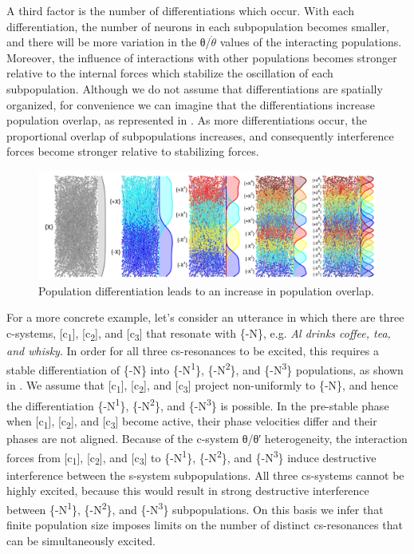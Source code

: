   A third factor is the number of differentiations which occur. With each differentiation, the number of neurons in each subpopulation becomes smaller, and there will be more variation in the θ/$\dot{\theta}$ values of the interacting populations. Moreover, the influence of interactions with other populations becomes stronger relative to the internal forces which stabilize the oscillation of each subpopulation.  Although we do not assume that differentiations are spatially organized, for convenience we can imagine that the differentiations increase population overlap, as represented in {}. As more differentiations occur, the proportional overlap of subpopulations increases, and consequently interference forces become stronger relative to stabilizing forces.

  
\begin{figure}
\includegraphics[width=\textwidth]{figures/Tilsen-img91.png}
\caption{Population differentiation leads to an increase in population overlap.}
\label{fig:4:41}
\end{figure}
 

  For a more concrete example, let's consider an utterance in which there are three c-systems, [c\textsubscript{1}], [c\textsubscript{2}], and [c\textsubscript{3}] that resonate with \{-N\}, e.g. \textit{Al drinks coffee, tea, and whisky}. In order for all three cs-resonances to be excited, this requires a stable differentiation of \{-N\} into \{-N\textsuperscript{1}\}, \{-N\textsuperscript{2}\}, and \{-N\textsuperscript{3}\} populations, as shown in {}. We assume that [c\textsubscript{1}], [c\textsubscript{2}], and [c\textsubscript{3}] project non-uniformly to \{-N\}, and hence the differentiation \{-N\textsuperscript{1}\}, \{-N\textsuperscript{2}\}, and \{-N\textsuperscript{3}\} is possible. In the pre-stable phase when [c\textsubscript{1}], [c\textsubscript{2}], and [c\textsubscript{3}] become active, their phase velocities differ and their phases are not aligned. Because of the c-system θ/θ′ heterogeneity, the interaction forces from [c\textsubscript{1}], [c\textsubscript{2}], and [c\textsubscript{3}] to \{-N\textsuperscript{1}\}, \{-N\textsuperscript{2}\}, and \{-N\textsuperscript{3}\} induce destructive interference between the s-system subpopulations. All three cs-systems cannot be highly excited, because this would result in strong destructive interference between \{-N\textsuperscript{1}\}, \{-N\textsuperscript{2}\}, and \{-N\textsuperscript{3}\} subpopulations. On this basis we infer that finite population size imposes limits on the number of distinct cs-resonances that can be simultaneously excited.


